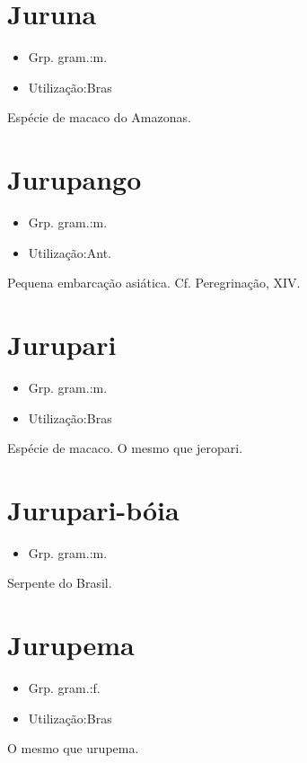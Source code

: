 \documentclass{article}
\begin{document}
\section{Juruna}
\begin{itemize}
\item {Grp. gram.:m.}
\end{itemize}
\begin{itemize}
\item {Utilização:Bras}
\end{itemize}
Espécie de macaco do Amazonas.
\section{Jurupango}
\begin{itemize}
\item {Grp. gram.:m.}
\end{itemize}
\begin{itemize}
\item {Utilização:Ant.}
\end{itemize}
Pequena embarcação asiática. Cf. \textunderscore Peregrinação\textunderscore , XIV.
\section{Jurupari}
\begin{itemize}
\item {Grp. gram.:m.}
\end{itemize}
\begin{itemize}
\item {Utilização:Bras}
\end{itemize}
Espécie de macaco.
O mesmo que \textunderscore jeropari\textunderscore .
\section{Jurupari-bóia}
\begin{itemize}
\item {Grp. gram.:m.}
\end{itemize}
Serpente do Brasil.
\section{Jurupema}
\begin{itemize}
\item {Grp. gram.:f.}
\end{itemize}
\begin{itemize}
\item {Utilização:Bras}
\end{itemize}
O mesmo que \textunderscore urupema\textunderscore .
\end{document}
